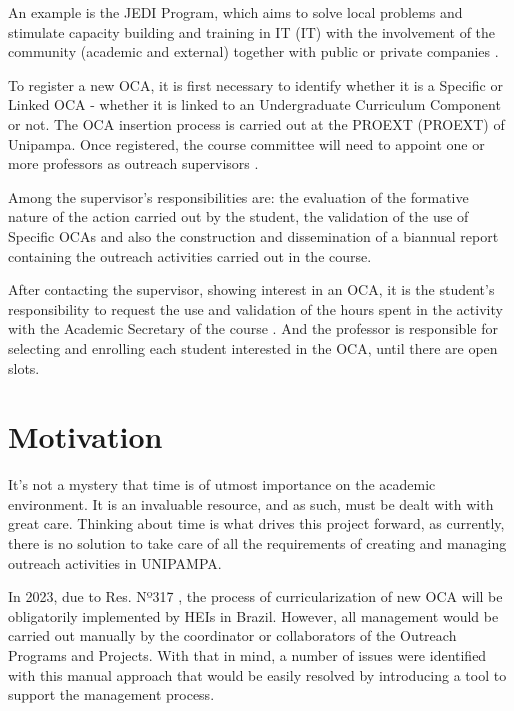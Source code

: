 An example is the JEDI Program, which aims to solve local problems and stimulate capacity building and training in \acl{IT} (\ac{IT}) with the involvement of the community (academic and external) together with public or private companies \cite{chamadaJedi}.

To register a new \acl{OCA}, it is first necessary to identify whether it is a Specific or Linked \ac{OCA} - whether it is linked to an Undergraduate Curriculum Component or not. The \ac{OCA} insertion process is carried out at the \acl{PROEXT} (\ac{PROEXT}) of Unipampa. Once registered, the course committee will need to appoint one or more professors as outreach supervisors \cite{res317}.

Among the supervisor's responsibilities are: the evaluation of the formative nature of the action carried out by the student, the validation of the use of Specific \acp{OCA} and also the construction and dissemination of a biannual report containing the outreach activities carried out in the course.

After contacting the supervisor, showing interest in an \ac{OCA}, it is the student's responsibility to request the use and validation of the hours spent in the activity with the Academic Secretary of the course \cite{res317}. And the professor is responsible for selecting and enrolling each student interested in the \ac{OCA}, until there are open slots.

\section{Motivation}\label{sec:motivation}

It's not a mystery that time is of utmost importance on the academic environment. It is an invaluable resource, and as such, must be dealt with with great care. Thinking about time is what drives this project forward, as currently, there is no solution to take care of all the requirements of creating and managing outreach activities in \ac{UNIPAMPA}.

In 2023, due to Res. Nº317 \cite{res317}, the process of curricularization of new \acl{OCA} will be obligatorily implemented by \aclp{HEI} in Brazil. However, all management would be carried out manually by the coordinator or collaborators of the Outreach Programs and Projects. With that in mind, a number of issues were identified with this manual approach that would be easily resolved by introducing a tool to support the management process.

